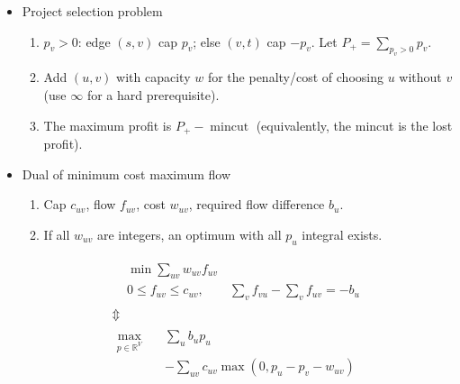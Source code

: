 \begin{itemize}
    \item Project selection problem
    \begin{enumerate}
      \itemsep-0.3em
      \item $p_v > 0$: edge $(s, v)$ cap $p_v$; else $(v, t)$ cap $-p_v$. Let $P_+=\sum_{p_v>0}p_v$.
      \item Add $(u,v)$ with capacity $w$ for the penalty/cost of choosing $u$ without $v$ (use $\infty$ for a hard prerequisite).
      \item The maximum profit is $P_+-\operatorname{mincut}$ (equivalently, the mincut is the lost profit).
    \end{enumerate}
    \item Dual of minimum cost maximum flow
    \begin{enumerate}
      \itemsep-0.3em
      \item Cap $c_{uv}$, flow $f_{uv}$, cost $w_{uv}$, required flow difference $b_u$.
      \item If all $w_{uv}$ are integers, an optimum with all $p_u$ integral exists.
    \end{enumerate}
    \[
    \begin{gathered}
      \begin{aligned}
        &\min\sum_{uv} w_{uv}f_{uv} \\
        &0\leq f_{uv}\leq c_{uv},\qquad
        \sum_{v} f_{vu}-\sum_{v} f_{uv}=-b_u
      \end{aligned} \\[0.1em]
      \Updownarrow \\[-0.1em]
      \begin{aligned}
        \max_{p\in\mathbb{R}^{V}}\quad
        &\sum_{u}b_up_u \\
        &-\sum_{uv}c_{uv}\max(0,p_u-p_v-w_{uv})
      \end{aligned}
    \end{gathered}
    \]
\end{itemize}
